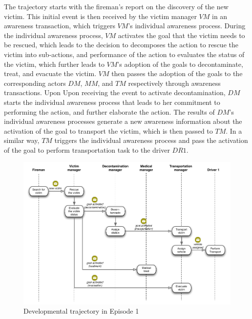 The trajectory starts with the fireman's report on the discovery of the new victim. This initial event is then received by the victim manager $VM$ in an awareness transaction, which triggers $VM$'s individual awareness process. During the individual awareness process, $VM$ activates the goal that the victim needs to be rescued, which leads to the decision to decomposes the action to rescue the victim into sub-actions, and performance of the action to evaluates the status of the victim, which further leads to $VM$'s adoption of the goals to decontaminate, treat, and evacuate the victim. $VM$ then passes the adoption of the goals to the corresponding actors $DM$, $MM$, and $TM$ respectively through awareness transactions. Upon Upon receiving the event to activate decontamination, $DM$ starts the individual awareness process that leads to her commitment to performing the action, and further elaborate the action. The results of $DM$'s individual awareness processes generate a new awareness information about the activation of the goal to transport the victim, which is then passed to $TM$. In a similar way, $TM$ triggers the individual awareness process and pass the activation of the goal to perform transportation task to the driver $DR1$.

\begin{figure}[htbp] %
   \centering
   \includegraphics[width=5.8in]{episode_1_interaction.pdf} 
   \caption{Developmental trajectory in Episode 1}
   \label{fig:episode_1_interaction}
\end{figure}

